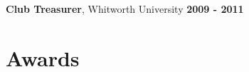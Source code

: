 \documentclass[margin]{res}
\begin{document}
\begin{resume}
\begin{itemize}
    \end{itemize}\vspace{-12pt}
{\bf Club Treasurer}, Whitworth University \hfill {\bf2009 - 2011}






\section{Awards}


\end{resume}
\end{document}
